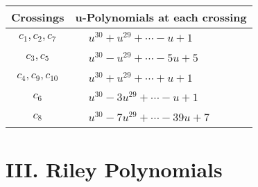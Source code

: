\documentclass[1p]{elsarticle_modified}
\theoremstyle{definition}
\begin{document}
\begin{tabular}{m{50pt}|m{274pt}}
Crossings & \hspace{64pt}u-Polynomials at each crossing \\
\hline $$\begin{aligned}c_{1},c_{2},c_{7}\end{aligned}$$&$\begin{aligned}
&u^{30}+u^{29}+\cdots- u+1
\end{aligned}$\\
\hline $$\begin{aligned}c_{3},c_{5}\end{aligned}$$&$\begin{aligned}
&u^{30}- u^{29}+\cdots-5 u+5
\end{aligned}$\\
\hline $$\begin{aligned}c_{4},c_{9},c_{10}\end{aligned}$$&$\begin{aligned}
&u^{30}+u^{29}+\cdots+u+1
\end{aligned}$\\
\hline $$\begin{aligned}c_{6}\end{aligned}$$&$\begin{aligned}
&u^{30}-3 u^{29}+\cdots- u+1
\end{aligned}$\\
\hline $$\begin{aligned}c_{8}\end{aligned}$$&$\begin{aligned}
&u^{30}-7 u^{29}+\cdots-39 u+7
\end{aligned}$\\
\hline
\end{tabular}\newpage\renewcommand{\arraystretch}{1}
\centering \section*{ III. Riley Polynomials}
\end{document}
